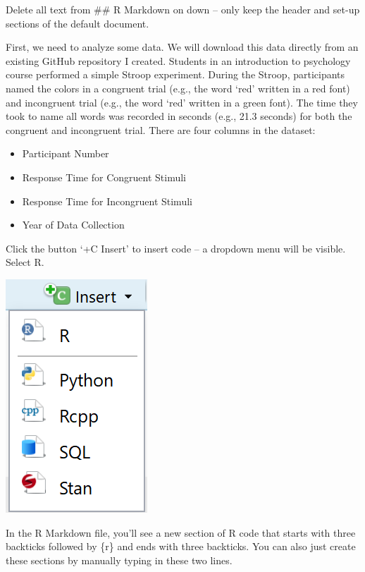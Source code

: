 \documentclass[
  oneside]{krantz}
\begin{document}
Delete all text from \#\# R Markdown on down -- only keep the header and set-up
sections of the default document.

First, we need to analyze some data. We will download this data directly from an
existing GitHub repository I created. Students in an introduction to psychology
course performed a simple Stroop experiment. During the Stroop, participants
named the colors in a congruent trial (e.g., the word `red' written in a red
font) and incongruent trial (e.g., the word `red' written in a green font). The
time they took to name all words was recorded in seconds (e.g., 21.3 seconds)
for both the congruent and incongruent trial. There are four columns in the
dataset:

\begin{itemize}
\item
  Participant Number
\item
  Response Time for Congruent Stimuli
\item
  Response Time for Incongruent Stimuli
\item
  Year of Data Collection
\end{itemize}

Click the button `+C Insert' to insert code -- a dropdown menu will be visible.
Select R.

\begin{center}\includegraphics[width=0.5\linewidth]{images/2f929ee323a9f222c85675f5fc45672f} \end{center}

In the R Markdown file, you'll see a new section of R code that starts with
three backticks followed by \{r\} and ends with three backticks. You can also just create these sections by
manually typing in these two lines.
\end{document}
